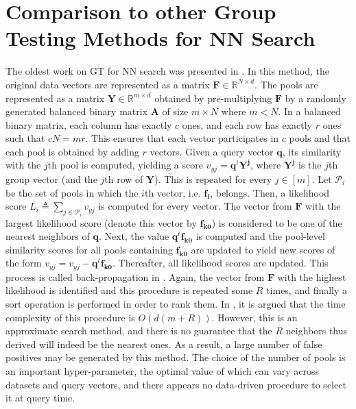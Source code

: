 \documentclass[sigconf, anonymous, review]{acmart}
\begin{document}
\section{Comparison to other Group Testing Methods for NN Search}
\label{sec:comparison}
The oldest work on GT for NN search was presented in \cite{Shi2014}. In this method, the original data vectors are represented as a matrix $\boldsymbol{F} \in \mathbb{R}^{N \times d}$. The pools are represented as a matrix $\boldsymbol{Y} \in \mathbb{R}^{m \times d}$ obtained by pre-multiplying $\boldsymbol{F}$ by a randomly generated balanced binary matrix $\boldsymbol{A}$ of size $m \times N$ where $m < N$. In a balanced binary matrix, each column has exactly $c$ ones, and each row has exactly $r$ ones such that $cN = mr$. This ensures that each vector participates in $c$ pools and that each pool is obtained by adding $r$ vectors. Given a query vector $\boldsymbol{q}$, its similarity with the $j$th pool is computed, yielding a score $v_{yj} = \boldsymbol{q}^t \boldsymbol{Y^j}$, where $\boldsymbol{Y^j}$ is the $j$th group vector (and the $j$th row of $\boldsymbol{Y}$). This is repeated for every $j \in [m]$. Let $\mathcal{P}_i$ be the set of pools in which the $i$th vector, i.e. $\boldsymbol{f_i}$, belongs. Then, a likelihood score $L_i \triangleq \sum_{j \in \mathcal{P}_i} v_{yj}$ is computed for every vector. The vector from $\boldsymbol{F}$ with the largest likelihood score (denote this vector by $\boldsymbol{f_{k0}}$) is considered to be one of the nearest neighbors of $\boldsymbol{q}$. Next, the value $\boldsymbol{q}^t \boldsymbol{f_{k0}}$ is computed and the pool-level similarity scores for all pools containing  $\boldsymbol{f_{k0}}$ are updated to yield new scores of the form $v_{yj} = v_{yj} - \boldsymbol{q}^t \boldsymbol{f_{k0}}$. Thereafter, all likelihood scores are updated. This process is called back-propagation in \cite{Shi2014}. Again, the vector from $\boldsymbol{F}$ with the highest likelihood is identified and this procedure is repeated some $R$ times, and finally a sort operation is performed in order to rank them. In \cite{Shi2014}, it is argued that the time complexity of this procedure is $O( d (m + R))$. However, this is an approximate search method, and there is no guarantee that the $R$ neighbors thus derived will indeed be the nearest ones. As a result, a large number of false positives may be generated by this method. The choice of the number of pools is an important hyper-parameter, the optimal value of which can vary across datasets and query vectors, and there appears no data-driven procedure to select it at query time.
\end{document}
